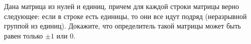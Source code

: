 \documentclass{article}
\begin{document}
Дана матрица из нулей и единиц, причем для каждой строки матрицы верно следующее: если в строке есть единицы, то они все идут подряд 
(неразрывной группой из единиц). Докажите, что определитель такой матрицы может быть равен только $\pm 1$ или $0$.
\end{document}
